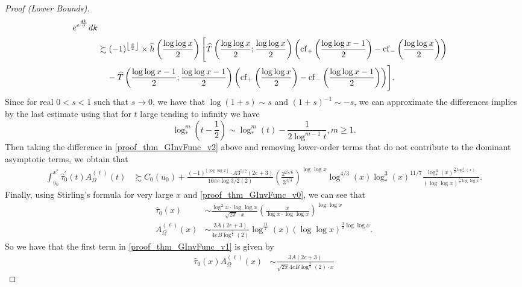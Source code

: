 \documentclass[11pt,reqno,a4letter]{article}
\numberwithin{figure}{section}
\numberwithin{table}{section}
\newcommand{\floor}[1]{\left\lfloor #1 \right\rfloor}
\newcommand{\Floor}[2]{\ensuremath{\left\lfloor \frac{#1}{#2} \right\rfloor}}
\theoremstyle{plain}
\numberwithin{theorem}{section}
\theoremstyle{definition}
\begin{document}
\begin{proof}[Proof (Lower Bounds)]
\begin{align}
     e^{e^{\frac{4k}{3}}} dk \\ 
\notag 
     & \succsim (-1)^{\Floor{x}{2}} \times \widehat{h}\left(\frac{\log\log x}{2}\right) \Biggl[ 
     \widehat{T}\left(\frac{\log\log x}{2}; \frac{\log\log x}{2}\right) \left( 
     \operatorname{cf}_{+}\left(\frac{\log\log x-1}{2}\right) - 
     \operatorname{cf}_{-}\left(\frac{\log\log x}{2}\right)
     \right) \\ 
\notag 
     & \phantom{\succsim\ } - 
     \widehat{T}\left(\frac{\log\log x-1}{2}; \frac{\log\log x-1}{2}\right) \left( 
     \operatorname{cf}_{+}\left(\frac{\log\log x}{2}\right) - 
     \operatorname{cf}_{-}\left(\frac{\log\log x-1}{2}\right)
     \right) 
     \Biggr]. 
\end{align} 
Since for real $0 < s < 1$ such that $s \rightarrow 0$, we have that $\log(1+s) \sim s$ and 
$(1+s)^{-1} \sim -s$, we can approximate the differences implies by the last estimate using that 
for $t$ large tending to infinity we have 
\[
     \log_{\ast}^m\left(t - \frac{1}{2}\right) \sim \log_{\ast}^{m}(t) - 
     \frac{1}{2 \log^{m-1} t}, m \geq 1. 
\]
Then taking the difference in \eqref{proof_thm_GInvFunc_v2} above and removing lower-order terms that 
do not contribute to the dominant asymptotic terms, we obtain that 
\begin{align} 
\label{proof_thm_GInvFunc_v3} 
\int_{u_0}^{x^{\ast}} \widehat{\tau}_0^{\prime}(t) A_{\Omega}^{(\ell)}(t) & \succsim 
      C_0(u_0) + \frac{(-1)^{\floor{\log\log x}} \cdot A 3^{5/2} (2e+3)}{16\pi e \log{3/2}(2)} \left( 
      \frac{2^{25/6}}{3^{4/3}}\right)^{\log\log x} \log^{4/3}(x) \log_{\ast}^3(x)^{11/7} 
      \frac{\log_{\ast}^4(x)^{\frac{3}{2}\log_{\ast}^4(x)}}{(\log\log x)^{\frac{5}{2} \log\log x}}. 
\end{align} 
Finally, using Stirling's formula for very large $x$ and 
\eqref{proof_thm_GInvFunc_v0}, we can see that 
\begin{align*} 
\widehat{\tau}_0(x) & \sim \frac{\log^2 x \cdot \log\log x}{\sqrt{2\pi} \cdot x} \left( 
     \frac{x}{\log x \cdot \log\log x}\right)^{\log\log x} \\ 
A_{\Omega}^{(\ell)}(x) & \sim 
     \frac{3A(2e+3)}{4eB \log^{\frac{3}{2}}(2)} \log^{\frac{11}{7}}(x) (\log\log x)^{\frac{3}{2}\log\log x}. 
\end{align*} 
So we have that the first term in \eqref{proof_thm_GInvFunc_v1} is given by 
\begin{align*} 
\widehat{\tau}_0(x) A_{\Omega}^{(\ell)}(x) & \sim 
     \frac{3A(2e+3)}{\sqrt{2\pi}4eB \log^{\frac{3}{2}}(2) \cdot x}

\end{align*}
\end{proof}
\end{document}
